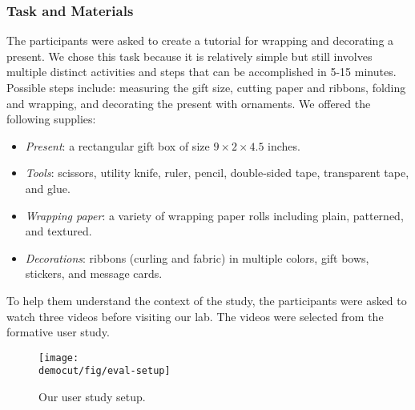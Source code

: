 \subsubsection{Task and Materials}
The participants were asked to create a tutorial for wrapping and decorating a present. We chose this task because it is relatively simple but still involves multiple distinct activities and steps that can be accomplished in 5-15 minutes. Possible steps include: measuring the gift size, cutting paper and ribbons, folding and wrapping, and decorating the present with ornaments.
We offered the following supplies:
\begin{itemize}
  \item \emph{Present}: a rectangular gift box of size $9 \times 2 \times 4.5$ inches.
  \item \emph{Tools}: scissors, utility knife, ruler, pencil, double-sided tape, transparent tape, and glue.
  \item \emph{Wrapping paper}: a variety of wrapping paper rolls including plain, patterned, and textured.
  \item \emph{Decorations}: ribbons (curling and fabric) in multiple colors, gift bows, stickers, and message cards.
\end{itemize}
To help them understand the context of the study, the participants were asked to watch three videos before visiting our lab. The videos were selected from the formative user study.

\begin{figure}[t]
  \centering
\texttt{[image: \\democut/fig/eval-setup]}
  \caption{Our user study setup.}
  \label{fig:eval-setup}
\end{figure}



